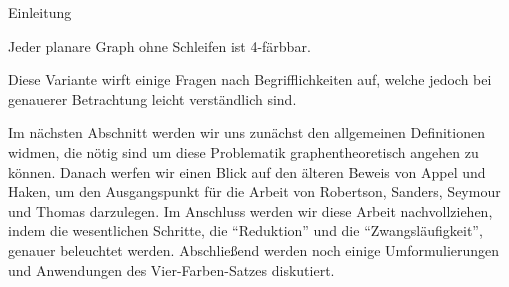 \begin{chapter}{Einleitung}
 \begin{satz}
  Jeder planare Graph ohne Schleifen ist 4-färbbar.
 \end{satz}
 
 Diese Variante wirft einige Fragen nach Begrifflichkeiten auf, welche jedoch bei genauerer Betrachtung leicht verständlich sind. 
 
 Im nächsten Abschnitt werden wir uns zunächst den allgemeinen Definitionen widmen, die nötig sind um diese Problematik graphentheoretisch angehen zu können. Danach werfen wir einen Blick auf den älteren Beweis von Appel und Haken, um den Ausgangspunkt für die Arbeit von Robertson, Sanders, Seymour und Thomas darzulegen. Im Anschluss werden wir diese Arbeit nachvollziehen, indem die wesentlichen Schritte, die ``Reduktion'' und die ``Zwangsläufigkeit'', genauer beleuchtet werden. Abschließend werden noch einige Umformulierungen und Anwendungen des Vier-Farben-Satzes diskutiert.


\end{chapter}